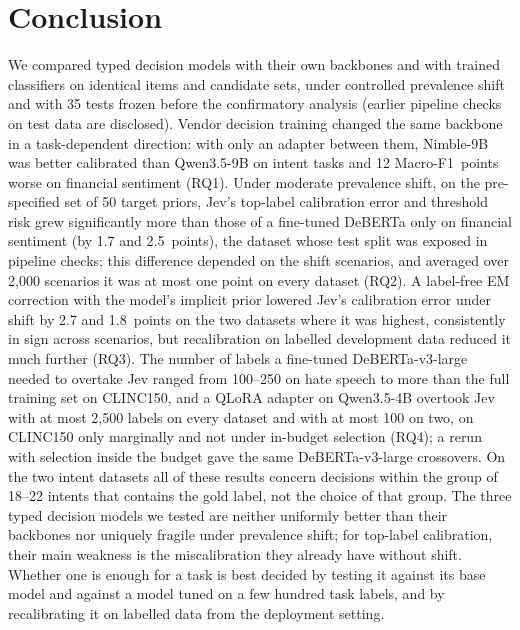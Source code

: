 \section{Conclusion}
\label{sec:conclusion}

We compared typed decision models with their own backbones and with trained classifiers on identical items and
candidate sets, under controlled prevalence shift and with 35 tests frozen before the confirmatory analysis (earlier
pipeline checks on test data are disclosed). Vendor decision
training changed the same backbone in a task-dependent direction: with only an adapter between them, Nimble-9B was better
calibrated than Qwen3.5-9B on intent tasks and 12 Macro-F1~points worse on financial sentiment (RQ1). Under moderate
prevalence shift, on the pre-specified set of 50 target priors, Jev's top-label calibration error and threshold risk
grew significantly more than those of a fine-tuned DeBERTa only on financial sentiment (by 1.7 and 2.5~points), the
dataset whose test split was exposed in pipeline checks; this difference depended on the shift scenarios, and averaged
over 2{,}000 scenarios it was at most one point on every dataset (RQ2). A label-free EM correction with the model's implicit
prior lowered Jev's calibration error under shift by 2.7 and 1.8~points on the two datasets where it was highest,
consistently in sign across scenarios, but recalibration on labelled development data reduced it much further (RQ3).
The number of labels a fine-tuned DeBERTa-v3-large needed to overtake Jev ranged from 100--250 on hate speech to more
than the full training set on CLINC150, and a QLoRA adapter on Qwen3.5-4B overtook Jev with at most 2{,}500 labels on
every dataset and with at most 100 on two, on CLINC150 only marginally and not under in-budget selection (RQ4); a
rerun with selection inside the budget gave the same DeBERTa-v3-large crossovers. On the two intent datasets all of these
results concern decisions within the group of 18--22 intents that contains the gold label, not the choice of that group.
The three typed decision models we tested are neither uniformly better than their backbones nor uniquely fragile under
prevalence shift; for top-label calibration, their main weakness is the miscalibration they already have without shift. Whether
one is enough for a task is best decided by testing it against its base model and against a model tuned on a few hundred
task labels, and by recalibrating it on labelled data from the deployment setting.
